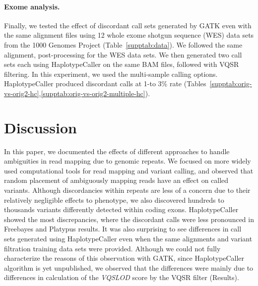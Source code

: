 \documentclass{bioinfo}
\newcommand{\junk}[1]{}
\begin{document}
\paragraph{Exome analysis.}
Finally, we tested the effect of discordant call sets generated by GATK even with the same alignment files using 12 whole exome shotgun sequence (WES) data sets from the 1000 Genomes Project (Table~\ref{supptab:data}). We followed the same alignment, post-processing for the WES data sets.
We then generated two call sets each using HaplotypeCaller on the same BAM files, followed with VQSR filtering.
In this experiment, we used the multi-sample calling options. HaplotypeCaller produced discordant calls at 1-to 3\% rate
(Tables~\ref{supptab:orig-vs-orig2-hc},\ref{supptab:orig-vs-orig2-multiple-hc}). 


\vspace*{-0.5cm}
\section{Discussion}

\junk{
The introduction of HTS platforms  quickly revolutionized the way we do biological research\citep{Mardis2008,Metzker2010}. Furthermore, HTS technology  already started to make impact on human health in the form of personalized medicine
through clinical sequencing~\citep{Biesecker2009}, breast cancer subtype detection~\citep{Bosdet2013}, and small molecule drug target site identification~\citep{Rodriguez2014}. However, both sequencing technologies themselves~\citep{Kavak2015},
 and the computational tools are still far from being mature in terms of accuracy~\citep{Alkan2011,Nielsen2011}. The complexity and repetitive nature of human genomes introduce further challenges for reliable characterization of genomic variants~\citep{Treangen2012}.
}

In this paper, we documented the effects of different approaches to handle ambiguities in read mapping due to genomic repeats. We focused on more widely used computational tools for read mapping and variant calling, and observed that random placement of ambiguously mapping reads have an effect on called variants. Although discordancies within repeats are less of a concern due to their relatively negligible 
effects to phenotype, we also discovered hundreds to thousands variants differently detected within coding exons. HaplotypeCaller showed the most discrepancies, where the discordant calls were less pronounced in Freebayes and Platypus results. It was also surprising to see differences in call sets generated using HaplotypeCaller even when the same alignments and variant filtration training data sets were provided. Although we could not fully characterize the reasons
of this observation with GATK, since HaplotypeCaller algorithm is yet unpublished, we observed that the differences were
mainly due to differences in calculation of the {\it VQSLOD} score by the VQSR filter (Results). 
\end{document}
